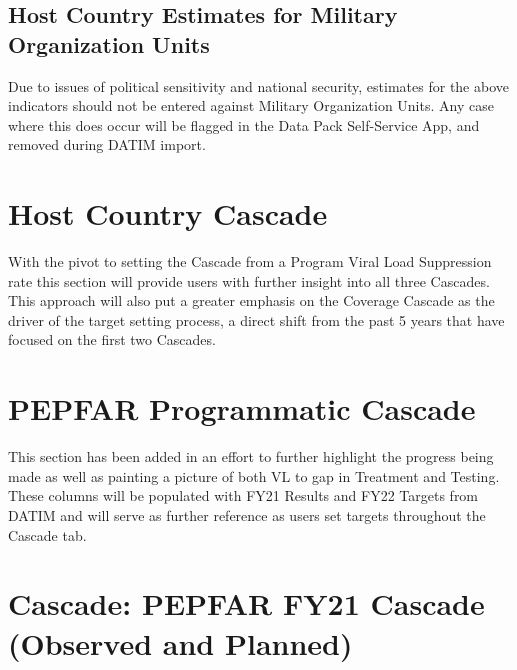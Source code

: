 \documentclass[
  openany]{book}
\begin{document}
\hypertarget{host-country-estimates-for-military-organization-units}{%
\subsection{Host Country Estimates for Military Organization Units}\label{host-country-estimates-for-military-organization-units}}

Due to issues of political sensitivity and national security, estimates
for the above indicators should not be entered against Military
Organization Units. Any case where this does occur will be flagged in
the Data Pack Self-Service App, and removed during DATIM import.

\hypertarget{host-country-cascade}{%
\section{Host Country Cascade}\label{host-country-cascade}}

With the pivot to setting the Cascade from a Program Viral Load
Suppression rate this section will provide users with further insight
into all three Cascades. This approach will also put a greater emphasis
on the Coverage Cascade as the driver of the target setting process, a
direct shift from the past 5 years that have focused on the first two
Cascades.

\hypertarget{pepfar-programmatic-cascade}{%
\section{PEPFAR Programmatic Cascade}\label{pepfar-programmatic-cascade}}

This section has been added in an effort to further highlight the
progress being made as well as painting a picture of both VL to gap in
Treatment and Testing. These columns will be populated with FY21 Results
and FY22 Targets from DATIM and will serve as further reference as users
set targets throughout the Cascade tab.

\hypertarget{cascade-pepfar-fy21-cascade-observed-and-planned}{%
\section{Cascade: PEPFAR FY21 Cascade (Observed and Planned)}\label{cascade-pepfar-fy21-cascade-observed-and-planned}}
\end{document}
